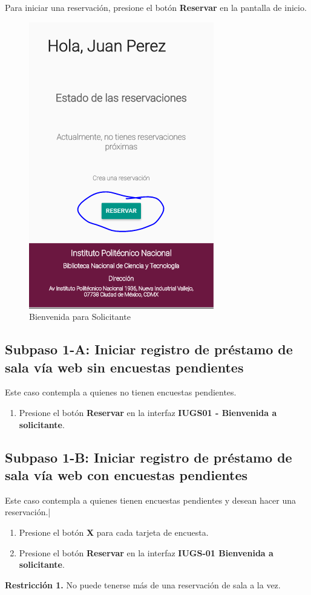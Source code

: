 Para iniciar una reservación, presione el botón \textbf{Reservar} en 
la pantalla de inicio.
	\begin{figure}[hbtp]
		
		\includegraphics[scale=0.3]{images/InterfazMovil/IUGS02_binevenida.png}
		\caption{Bienvenida para Solicitante}
	\end{figure}
	
\subsection{Subpaso 1-A: Iniciar registro de préstamo de sala vía web sin encuestas pendientes}
Este caso contempla a quienes no tienen encuestas pendientes.
\begin{enumerate}
	\item Presione el botón \textbf{Reservar} en la interfaz
		\textbf{IUGS01 - Bienvenida a solicitante}.
\end{enumerate}

\subsection{Subpaso 1-B: Iniciar registro de préstamo de sala vía web con encuestas pendientes}
Este caso contempla a quienes tienen encuestas pendientes y
desean hacer una reservación.|
\begin{enumerate}
	\item Presione el botón \textbf{X} para cada tarjeta de encuesta.
	\item Presione el botón \textbf{Reservar} en la interfaz
		\textbf{IUGS-01 Bienvenida a solicitante}.
\end{enumerate}

\textbf{Restricción 1.} No puede tenerse más de una reservación de sala
	a la vez.